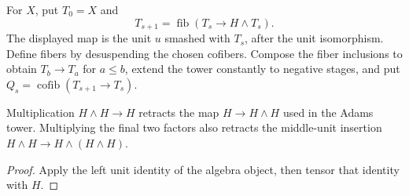 \begin{definition}
  \label{def:h6-fiber-tower}
  \leanok
  For $X$, put $T_0=X$ and
  \[
    T_{s+1}=\operatorname{fib}(T_s\longrightarrow H\wedge T_s).
  \]
  The displayed map is the unit $u$ smashed with $T_s$, after the unit
  isomorphism.  Define fibers by desuspending the chosen cofibers.
  Compose the fiber inclusions to obtain $T_b\to T_a$ for $a\le b$,
  extend the tower constantly to negative stages, and put
  $Q_s=\operatorname{cofib}(T_{s+1}\to T_s)$.
\end{definition}

\begin{proposition}
  \label{prop:h6-unit-splits}
  \leanok
  Multiplication $H\wedge H\to H$ retracts the map
  $H\to H\wedge H$ used in the Adams tower. Multiplying the final two
  factors also retracts the middle-unit insertion
  $H\wedge H\to H\wedge(H\wedge H)$.
\end{proposition}
\begin{proof}
  Apply the left unit identity of the algebra object, then tensor that
  identity with $H$.
  \leanok
\end{proof}

